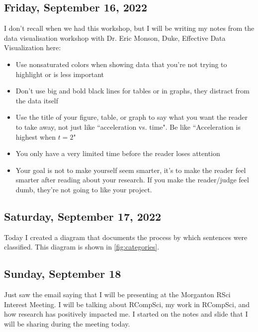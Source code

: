 \documentclass[11pt,letterpaper]{article}
\begin{document}
\subsection{Friday, September 16, 2022}
I don't recall when we had this workshop, but I will be writing my notes from the data visualisation workshop with Dr. Eric Monson, Duke, Effective Data Visualization here:
\begin{itemize}
    \item Use nonsaturated colors when showing data that you're not trying to highlight or is less important
    \item Don't use big and bold black lines for tables or in graphs, they distract from the data itself
    \item Use the title of your figure, table, or graph to say what you want the reader to take away, not just like ``acceleration vs. time". Be like ``Acceleration is highest when $t=2$"
    \item You only have a very limited time before the reader loses attention
    \item Your goal is not to make yourself seem smarter, it's to make the reader feel smarter after reading about your research. If you make the reader/judge feel dumb, they're not going to like your project.
\end{itemize}

\subsection{Saturday, September 17, 2022}
Today I created a diagram that documents the process by which sentences were classified. This diagram is shown in \ref{fig:categories}.

\subsection{Sunday, September 18}
Just saw the email saying that I will be presenting at the Morganton RSci Interest Meeting. I will be talking about RCompSci, my work in RCompSci, and how research has positively impacted me. I started on the notes and slide that I will be sharing during the meeting today.
\end{document}
